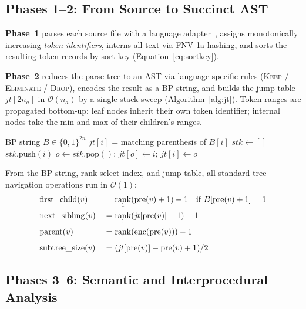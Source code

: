 \documentclass[journal,10pt,twoside]{IEEEtran}
\DeclareMathOperator{\rank}{rank}
\newcommand{\BigO}{\mathcal{O}}
\newcommand{\pre}{\mathrm{pre}}
\begin{document}
\subsection{Phases 1--2: From Source to Succinct AST}

\textbf{Phase~1} parses each source file with a
language adapter~\cite{treesitter}, assigns monotonically
increasing \textit{token identifiers}, interns all text
via FNV-1a hashing, and sorts the resulting token records
by sort key (Equation~\ref{eq:sortkey}).

\textbf{Phase~2} reduces the parse tree to an AST via
language-specific rules (\textsc{Keep} / \textsc{Eliminate}
/ \textsc{Drop}), encodes the result as a BP string,
and builds the jump table $\mathit{jt}[2n_a]$ in
$\BigO(n_a)$ by a single stack sweep (Algorithm~\ref{alg:jt}).
Token ranges are propagated bottom-up: leaf nodes inherit
their own token identifier; internal nodes take the min and
max of their children's ranges.

\begin{algorithm}[t]
\caption{Jump Table Construction (Phase~2)}
\label{alg:jt}
\small
\begin{algorithmic}[1]
\Require BP string $B \in \{0,1\}^{2n}$
\Ensure $\mathit{jt}[i]$ = matching parenthesis of $B[i]$
\State $\mathit{stk} \gets []$
    \State $\mathit{stk}.\mathrm{push}(i)$
  \Else
    \State $o \gets \mathit{stk}.\mathrm{pop}()$;\;
      $\mathit{jt}[o] \gets i$;\; $\mathit{jt}[i] \gets o$
  \EndIf
\EndFor
\end{algorithmic}
\end{algorithm}

From the BP string, rank-select index, and jump table, all
standard tree navigation operations run in $\BigO(1)$:
\begin{alignat}{2}
  &\mathrm{first\_child}(v)
    &&= \rank_1(\pre(v)+1)-1
    \quad\text{if }B[\pre(v)+1]=1\notag\\
  &\mathrm{next\_sibling}(v)
    &&= \rank_1(\mathit{jt}[\pre(v)]+1)-1\notag\\
  &\mathrm{parent}(v)
    &&= \rank_1(\mathrm{enc}(\pre(v)))-1\notag\\
  &\mathrm{subtree\_size}(v)
    &&= (\mathit{jt}[\pre(v)]-\pre(v)+1)/2\notag
\end{alignat}

\subsection{Phases 3--6: Semantic and Interprocedural Analysis}
\end{document}
